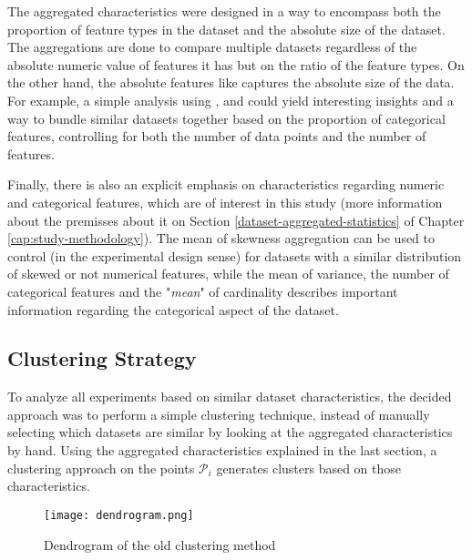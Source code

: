 The aggregated characteristics were designed in a way to encompass both the proportion of feature types in the dataset and the absolute size of the dataset. The  aggregations are done to compare multiple datasets regardless of the absolute numeric value of features it has but on the ratio of the feature types. On the other hand, the absolute features like  captures the absolute size of the data. For example, a simple analysis using ,  and  could yield interesting insights and a way to bundle similar datasets together based on the proportion of categorical features, controlling for both the number of data points and the number of features. 

Finally, there is also an explicit emphasis on characteristics regarding numeric and categorical features, which are of interest in this study (more information about the premisses about it on Section \ref{dataset-aggregated-statistics} of Chapter \ref{cap:study-methodology}). The mean of skewness aggregation can be used to control (in the experimental design sense) for datasets with a similar distribution of skewed or not numerical features, while the mean of variance, the number of categorical features and the "\textit{mean}" of cardinality describes important information regarding the categorical aspect of the dataset.  

\subsection{Clustering Strategy}
\label{subsec:clustering-strat}
To analyze all experiments based on similar dataset characteristics, the decided approach was to perform a simple clustering technique, instead of manually selecting which datasets are similar by looking at the aggregated characteristics by hand. Using the aggregated characteristics explained in the last section, a clustering approach on the points $\mathcal{P}_i$ generates clusters based on those characteristics.

\begin{figure}[!h]
    \centering
    \texttt{[image: dendrogram.png]}
    \caption{Dendrogram of the old clustering method}
    \label{fig:dendrogram}
\end{figure}

